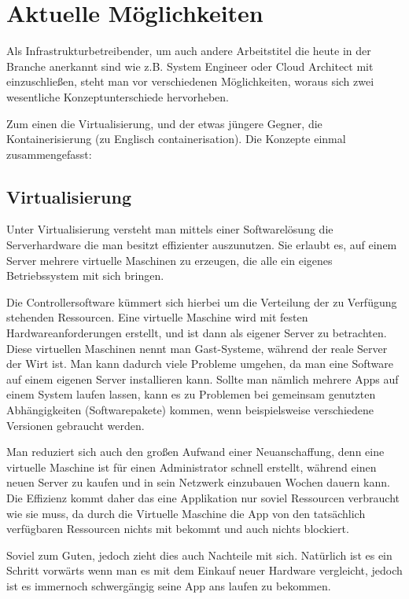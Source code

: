 \section{Aktuelle Möglichkeiten}
Als Infrastrukturbetreibender, um auch andere Arbeitstitel die heute in der Branche anerkannt sind wie z.B. System Engineer oder Cloud Architect mit einzuschließen, 
steht man vor verschiedenen Möglichkeiten, woraus sich zwei wesentliche Konzeptunterschiede hervorheben.

Zum einen die Virtualisierung, und der etwas jüngere Gegner, die Kontainerisierung (zu Englisch containerisation).
Die Konzepte einmal zusammengefasst:

\subsection{Virtualisierung}
Unter Virtualisierung versteht man mittels einer Softwarelösung die Serverhardware die man besitzt effizienter auszunutzen.
Sie erlaubt es, auf einem Server mehrere virtuelle Maschinen zu erzeugen, die alle ein eigenes Betriebssystem mit sich bringen.

Die Controllersoftware kümmert sich hierbei um die Verteilung der zu Verfügung stehenden Ressourcen. Eine virtuelle Maschine wird mit festen Hardwareanforderungen
erstellt, und ist dann als eigener Server zu betrachten.
Diese virtuellen Maschinen nennt man Gast-Systeme, während der reale Server der Wirt ist. Man kann dadurch viele Probleme umgehen, da man eine Software auf einem eigenen Server installieren kann.
Sollte man nämlich mehrere Apps auf einem System laufen lassen, kann es zu Problemen bei gemeinsam genutzten Abhängigkeiten (Softwarepakete) kommen, wenn beispielsweise verschiedene Versionen gebraucht werden.

Man reduziert sich auch den großen Aufwand einer Neuanschaffung, denn eine virtuelle Maschine ist für einen Administrator schnell erstellt, während einen neuen Server zu kaufen und in sein Netzwerk einzubauen Wochen dauern kann.
Die Effizienz kommt daher das eine Applikation nur soviel Ressourcen verbraucht wie sie muss, da durch die Virtuelle Maschine die App von den tatsächlich verfügbaren Ressourcen nichts mit bekommt und auch nichts blockiert.

Soviel zum Guten, jedoch zieht dies auch Nachteile mit sich.
Natürlich ist es ein Schritt vorwärts wenn man es mit dem Einkauf neuer Hardware vergleicht, jedoch ist es immernoch schwergängig seine App ans laufen zu bekommen.

